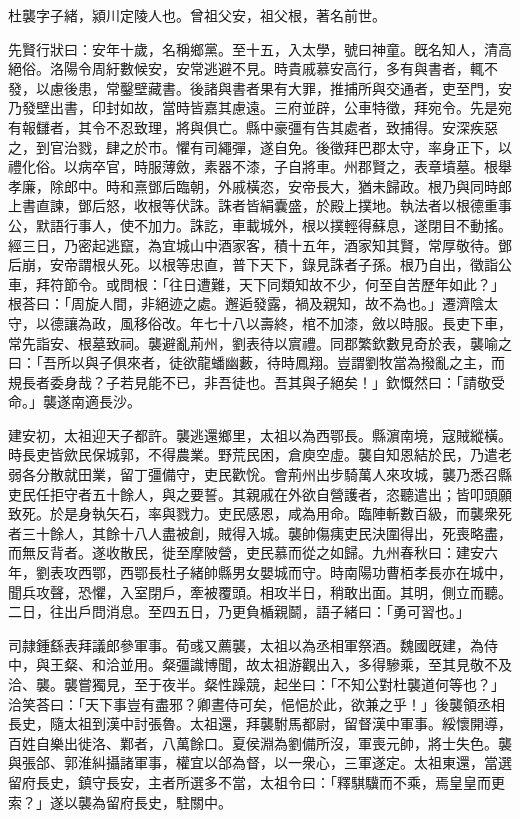 
\begin{pinyinscope}
杜襲字子緒，潁川定陵人也。曾祖父安，祖父根，著名前世。

先賢行狀曰：安年十歲，名稱鄉黨。至十五，入太學，號曰神童。旣名知人，清高絕俗。洛陽令周紆數候安，安常逃避不見。時貴戚慕安高行，多有與書者，輒不發，以慮後患，常鑿壁藏書。後諸與書者果有大罪，推捕所與交通者，吏至門，安乃發壁出書，印封如故，當時皆嘉其慮遠。三府並辟，公車特徵，拜宛令。先是宛有報讎者，其令不忍致理，將與俱亡。縣中豪彊有告其處者，致捕得。安深疾惡之，到官治戮，肆之於巿。懼有司繩彈，遂自免。後徵拜巴郡太守，率身正下，以禮化俗。以病卒官，時服薄斂，素器不漆，子自將車。州郡賢之，表章墳墓。根舉孝廉，除郎中。時和熹鄧后臨朝，外戚橫恣，安帝長大，猶未歸政。根乃與同時郎上書直諫，鄧后怒，收根等伏誅。誅者皆絹囊盛，於殿上撲地。執法者以根德重事公，默語行事人，使不加力。誅訖，車載城外，根以撲輕得蘇息，遂閉目不動搖。經三日，乃密起逃竄，為宜城山中酒家客，積十五年，酒家知其賢，常厚敬待。鄧后崩，安帝謂根乆死。以根等忠直，普下天下，錄見誅者子孫。根乃自出，徵詣公車，拜符節令。或問根：「往日遭難，天下同類知故不少，何至自苦歷年如此？」根荅曰：「周旋人間，非絕迹之處。邂逅發露，禍及親知，故不為也。」遷濟陰太守，以德讓為政，風移俗改。年七十八以壽終，棺不加漆，斂以時服。長吏下車，常先詣安、根墓致祠。襲避亂荊州，劉表待以賔禮。同郡繁欽數見奇於表，襲喻之曰：「吾所以與子俱來者，徒欲龍蟠幽藪，待時鳳翔。豈謂劉牧當為撥亂之主，而規長者委身哉？子若見能不已，非吾徒也。吾其與子絕矣！」欽慨然曰：「請敬受命。」襲遂南適長沙。

建安初，太祖迎天子都許。襲逃還鄉里，太祖以為西鄂長。縣濵南境，寇賊縱橫。時長吏皆歛民保城郭，不得農業。野荒民困，倉庾空虛。襲自知恩結於民，乃遣老弱各分散就田業，留丁彊備守，吏民歡恱。會荊州出步騎萬人來攻城，襲乃悉召縣吏民任拒守者五十餘人，與之要誓。其親戚在外欲自營護者，恣聽遣出；皆叩頭願致死。於是身執矢石，率與戮力。吏民感恩，咸為用命。臨陣斬數百級，而襲衆死者三十餘人，其餘十八人盡被創，賊得入城。襲帥傷痍吏民決圍得出，死喪略盡，而無反背者。遂收散民，徙至摩陂營，吏民慕而從之如歸。九州春秋曰：建安六年，劉表攻西鄂，西鄂長杜子緒帥縣男女嬰城而守。時南陽功曹栢孝長亦在城中，聞兵攻聲，恐懼，入室閉戶，牽被覆頭。相攻半日，稍敢出面。其明，側立而聽。二日，往出戶問消息。至四五日，乃更負楯親鬬，語子緒曰：「勇可習也。」

司隷鍾繇表拜議郎參軍事。荀彧又薦襲，太祖以為丞相軍祭酒。魏國旣建，為侍中，與王粲、和洽並用。粲彊識博聞，故太祖游觀出入，多得驂乘，至其見敬不及洽、襲。襲嘗獨見，至于夜半。粲性躁競，起坐曰：「不知公對杜襲道何等也？」洽笑荅曰：「天下事豈有盡邪？卿晝侍可矣，悒悒於此，欲兼之乎！」後襲領丞相長史，隨太祖到漢中討張魯。太祖還，拜襲駙馬都尉，留督漢中軍事。綏懷開導，百姓自樂出徙洛、鄴者，八萬餘口。夏侯淵為劉備所沒，軍喪元帥，將士失色。襲與張郃、郭淮糾攝諸軍事，權宜以郃為督，以一衆心，三軍遂定。太祖東還，當選留府長史，鎮守長安，主者所選多不當，太祖令曰：「釋騏驥而不乘，焉皇皇而更索？」遂以襲為留府長史，駐關中。


\end{pinyinscope}
